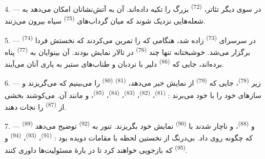 4. --- در سوی دیگر تئاتر،  \textsuperscript{(72)} بزرگ
را تکیه داده‌اند. آن به آتش‌نشانان امکان می‌دهد به شعله‌هایی نزدیک
شوند که میان گرداب‌های  \textsuperscript{(75)} سیاه بیرون
می‌زنند.

\VUsaut{5.0mm}
\VUsaut{3.4mm}

5. ---  \textsuperscript{(74)} در سرسرای
 \textsuperscript{(73)} زاده شد، هنگامی که
 را تمرین می‌کردند که  نخستش فردا برگزار
می‌شد. خوشبختانه تنها چند  \textsuperscript{(76)} در
تالار نمایش بودند. آن بینوایان به  \textsuperscript{(77)}
پناه برده‌اند، جایی که  \textsuperscript{(86)}
دلیر با نردبان و طناب‌های ستبر به یاری آنان می‌آیند.

6. --- زیر  \textsuperscript{(78)}، جایی که
 \textsuperscript{(79)} از نمایش خبر می‌دهد،
 \textsuperscript{(81)} 
\textsuperscript{(80)} را می‌بینیم که می‌گریزند و سازهای خود را با خود
می‌برند :  \textsuperscript{(81)}، 
\textsuperscript{(82)}،  \textsuperscript{(83)}،
 \textsuperscript{(84)}، 
\textsuperscript{(85)}، و مانند آن. می‌کوشند بخشی از 
\textsuperscript{(87)} را نجات دهند.

7. ---  \textsuperscript{(89)} و
 \textsuperscript{(88)}، 
و  ناچار شدند با 
\textsuperscript{(90)} نمایش خود بگریزند. تنور به 
\textsuperscript{(92)} توضیح می‌دهد که چگونه روی داد. 
بی‌درنگ از نخستین لحظه با مقامات دویده بود : 
\textsuperscript{(91)}،  \textsuperscript{(93)}،
 \textsuperscript{(94)} و 
\textsuperscript{(95)} که بازجویی خواهند کرد تا در بارهٔ مسئولیت‌ها
داوری کنند.

\VUsaut{6.0mm}
\VUfilet{22mm}

